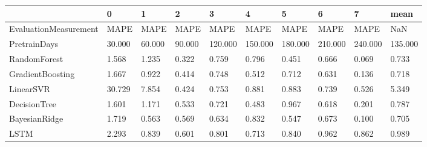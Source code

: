 \begin{tabular}{llllllllll}
\toprule
{} &      0 &      1 &      2 &       3 &       4 &       5 &       6 &       7 &    mean \\
\midrule
EvaluationMeasurement &   MAPE &   MAPE &   MAPE &    MAPE &    MAPE &    MAPE &    MAPE &    MAPE &     NaN \\
PretrainDays          & 30.000 & 60.000 & 90.000 & 120.000 & 150.000 & 180.000 & 210.000 & 240.000 & 135.000 \\
RandomForest          &  1.568 &  1.235 &  0.322 &   0.759 &   0.796 &   0.451 &   0.666 &   0.069 &   0.733 \\
GradientBoosting      &  1.667 &  0.922 &  0.414 &   0.748 &   0.512 &   0.712 &   0.631 &   0.136 &   0.718 \\
LinearSVR             & 30.729 &  7.854 &  0.424 &   0.753 &   0.881 &   0.883 &   0.739 &   0.526 &   5.349 \\
DecisionTree          &  1.601 &  1.171 &  0.533 &   0.721 &   0.483 &   0.967 &   0.618 &   0.201 &   0.787 \\
BayesianRidge         &  1.719 &  0.563 &  0.569 &   0.634 &   0.832 &   0.547 &   0.673 &   0.100 &   0.705 \\
LSTM                  &  2.293 &  0.839 &  0.601 &   0.801 &   0.713 &   0.840 &   0.962 &   0.862 &   0.989 \\
\bottomrule
\end{tabular}
